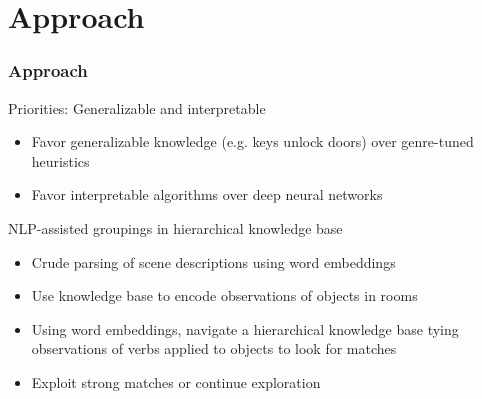 \section{Approach}

\begin{frame}
    \frametitle{Approach}

    \begin{block}{Priorities: Generalizable and interpretable}
        \begin{itemize}
            \item Favor generalizable knowledge (e.g. keys unlock doors)
                over genre-tuned heuristics
            \item Favor interpretable algorithms over deep neural
                networks
        \end{itemize}
    \end{block}

    \begin{block}{NLP-assisted groupings in hierarchical knowledge
        base}
        \begin{itemize}
            \item Crude parsing of scene descriptions using word
                embeddings
            \item Use knowledge base to encode observations of objects
                in rooms
            \item Using word embeddings, navigate a hierarchical
                knowledge base tying observations of verbs applied to
                objects to look for matches
            \item Exploit strong matches or continue exploration
        \end{itemize}
    \end{block}

\end{frame}


